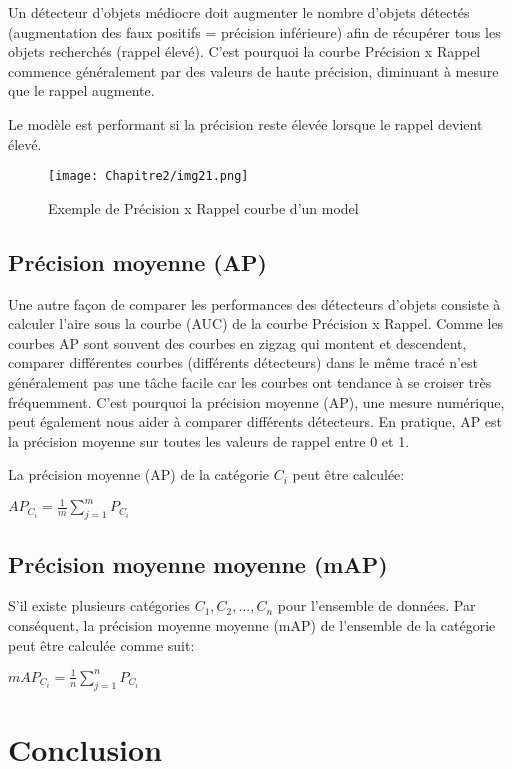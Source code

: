           Un détecteur d'objets médiocre doit augmenter le nombre d'objets détectés (augmentation des faux positifs = précision inférieure) afin de récupérer tous les objets recherchés (rappel élevé). C'est pourquoi la courbe Précision x Rappel commence généralement par des valeurs de haute précision, diminuant à mesure que le rappel augmente.
          
          Le modèle est performant si la précision reste élevée lorsque le rappel devient élevé.
          \begin{figure}[H]
               \centering
               \texttt{[image: Chapitre2/img21.png]}
               \caption{Exemple de Précision x Rappel courbe d'un model}
               \label{img21}
               \end{figure}
          
          \subsection{Précision moyenne (AP)}
          Une autre façon de comparer les performances des détecteurs d'objets consiste à calculer l'aire sous la courbe (AUC) de la courbe Précision x Rappel. Comme les courbes AP sont souvent des courbes en zigzag qui montent et descendent, comparer différentes courbes (différents détecteurs) dans le même tracé n'est généralement pas une tâche facile car les courbes ont tendance à se croiser très fréquemment. C'est pourquoi la précision moyenne (AP), une mesure numérique, peut également nous aider à comparer différents détecteurs. En pratique, AP est la précision moyenne sur toutes les valeurs de rappel entre 0 et 1.
          
          La précision moyenne (AP) de la catégorie $C_i$ peut être calculée:
          \begin{center} $AP_{C_i} = \frac{1}{m} \sum^{m}_{j=1} P_{C_i}$ \end{center}

          \subsection{Précision moyenne moyenne  (mAP)}
          S'il existe plusieurs catégories ${C_1, C_2, ... , C_n}$ pour l'ensemble de données. Par conséquent, la précision moyenne moyenne (mAP) de l'ensemble de la catégorie peut être calculée comme suit:
          \begin{center} $mAP_{C_i} = \frac{1}{n} \sum^{n}_{j=1} P_{C_i}$ \end{center}





\section{Conclusion} 
